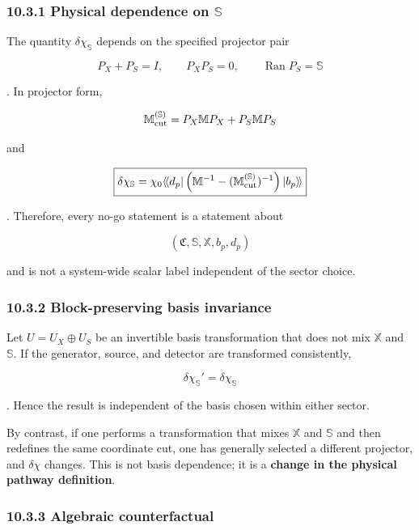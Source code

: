 \documentclass[
  10pt,
  a4paper,
]{article}
\begin{document}
\subsubsection{\texorpdfstring{10.3.1 Physical dependence on
\(\mathbb S\)}{10.3.1 Physical dependence on \textbackslash mathbb S}}\label{physical-dependence-on-mathbb-s}

The quantity \(\delta\chi_{\mathbb S}\) depends on the specified
projector pair

\[
P_X+P_S=I,
\qquad
P_XP_S=0,
\qquad
\operatorname{Ran}P_S=\mathbb S
\]

. In projector form,

\[
\mathbb M_{\rm cut}^{(\mathbb S)}
=P_X\mathbb MP_X+P_S\mathbb MP_S
\]

and

\[
\boxed{
\delta\chi_{\mathbb S}
=\chi_0\langle\!\langle d_p|
\left(\mathbb M^{-1}-(\mathbb M_{\rm cut}^{(\mathbb S)})^{-1}\right)
|b_p\rangle\!\rangle
}
\]

. Therefore, every no-go statement is a statement about

\[
(\mathfrak C,\mathbb S,\mathbb X,b_p,d_p)
\]

and is not a system-wide scalar label independent of the sector choice.

\subsubsection{10.3.2 Block-preserving basis
invariance}\label{block-preserving-basis-invariance}

Let \(U=U_X\oplus U_S\) be an invertible basis transformation that does
not mix \(\mathbb X\) and \(\mathbb S\). If the generator, source, and
detector are transformed consistently,

\[
\boxed{
\delta\chi_{\mathbb S}'=\delta\chi_{\mathbb S}
}
\]

. Hence the result is independent of the basis chosen within either
sector.

By contrast, if one performs a transformation that mixes \(\mathbb X\)
and \(\mathbb S\) and then redefines the same coordinate cut, one has
generally selected a different projector, and \(\delta\chi\) changes.
This is not basis dependence; it is a \textbf{change in the physical
pathway definition}.

\subsubsection{10.3.3 Algebraic
counterfactual}\label{algebraic-counterfactual}
\end{document}
